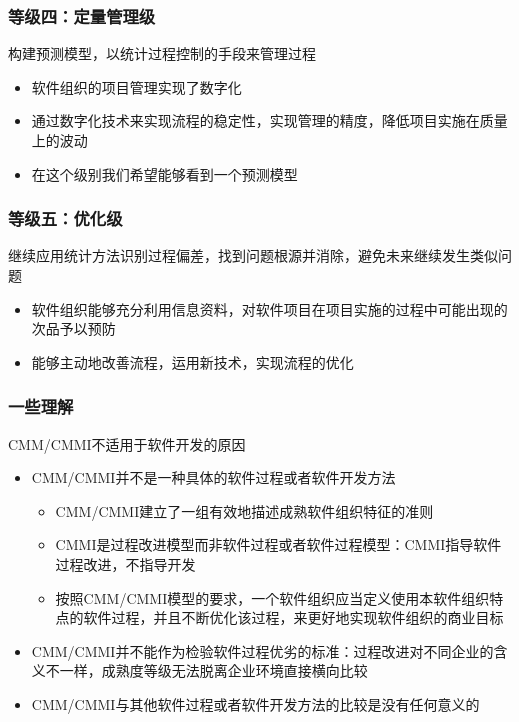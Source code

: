 \subsubsection{等级四：定量管理级}
构建预测模型，以统计过程控制的手段来管理过程
\begin{itemize}
    \item 软件组织的项目管理实现了数字化
    \item 通过数字化技术来实现流程的稳定性，实现管理的精度，降低项目实施在质量上的波动
    \item 在这个级别我们希望能够看到一个预测模型
\end{itemize}

\subsubsection{等级五：优化级}
继续应用统计方法识别过程偏差，找到问题根源并消除，避免未来继续发生类似问题
\begin{itemize}
    \item 软件组织能够充分利用信息资料，对软件项目在项目实施的过程中可能出现的次品予以预防
    \item 能够主动地改善流程，运用新技术，实现流程的优化
\end{itemize}

\subsubsection{一些理解}
CMM/CMMI不适用于软件开发的原因
\begin{itemize}
    \item CMM/CMMI并不是一种具体的软件过程或者软件开发方法
    \begin{itemize}
        \item CMM/CMMI建立了一组有效地描述成熟软件组织特征的准则
        \item CMMI是过程改进模型而非软件过程或者软件过程模型：CMMI指导软件过程改进，不指导开发
        \item 按照CMM/CMMI模型的要求，一个软件组织应当定义使用本软件组织特点的软件过程，并且不断优化该过程，来更好地实现软件组织的商业目标
    \end{itemize}
    \item CMM/CMMI并不能作为检验软件过程优劣的标准：过程改进对不同企业的含义不一样，成熟度等级无法脱离企业环境直接横向比较
    \item CMM/CMMI与其他软件过程或者软件开发方法的比较是没有任何意义的
\end{itemize}

